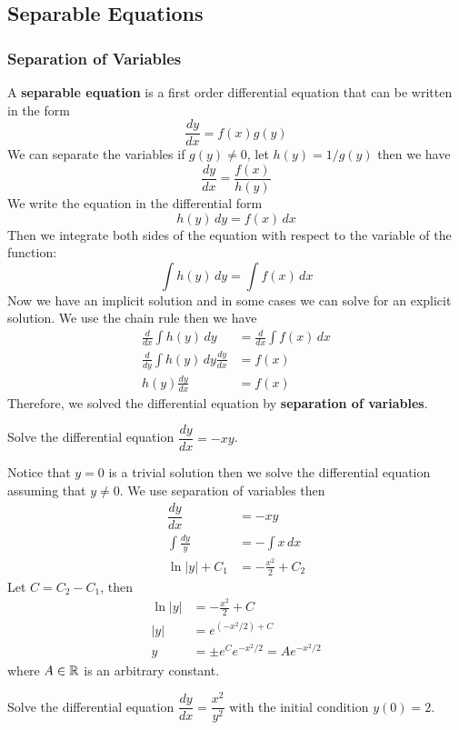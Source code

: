 \subsection{Separable Equations}
\subsubsection{Separation of Variables}
A \textbf{separable equation} is a first order differential equation that can
be written in the form
\[\frac{dy}{dx}=f(x)g(y)\]
We can separate the variables if \(g(y)\neq0\), let \(h(y)=1/g(y)\) then we
have
\[\frac{dy}{dx}=\frac{f(x)}{h(y)}\]
We write the equation in the differential form
\[h(y)\,dy=f(x)\,dx\]
Then we integrate both sides of the equation with respect to the variable of
the function:
\[\int h(y)\,dy=\int f(x)\,dx\]
Now we have an implicit solution and in some cases we can solve for an
explicit solution.
We use the chain rule then we have
\begin{align*}
    \frac{d}{dx}\int h(y)\,dy &= \frac{d}{dx}\int f(x)\,dx \\
    \frac{d}{dy}\int h(y)\,dy\frac{dy}{dx} &= f(x) \\
    h(y)\frac{dy}{dx} &= f(x)
\end{align*}
Therefore, we solved the differential equation by
\textbf{separation of variables}.
\begin{problem}
    Solve the differential equation \(\dfrac{dy}{dx}=-xy\).
\end{problem}
\begin{solution}
    Notice that \(y=0\) is a trivial solution then we solve the differential
    equation assuming that \(y\neq 0\).
    We use separation of variables then
    \begin{align*}
        \dfrac{dy}{dx} &= -xy \\
        \int\frac{dy}{y} &= -\int x\,dx \\
        \ln |y|+C_1 &= -\frac{x^2}{2}+C_2
    \end{align*}
    Let \(C=C_2-C_1\), then
    \begin{align*}
        \ln |y| &= -\frac{x^2}{2}+C \\
        |y| &= e^{(-x^2/2)+C} \\
        y &= \pm e^Ce^{-x^2/2}=Ae^{-x^2/2}
    \end{align*}
    where \(A\in\mathbb{R}\) is an arbitrary constant.
\end{solution}
\begin{problem}
    Solve the differential equation \(\dfrac{dy}{dx}=\dfrac{x^2}{y^2}\) with
    the initial condition \(y(0)=2\).
\end{problem}
